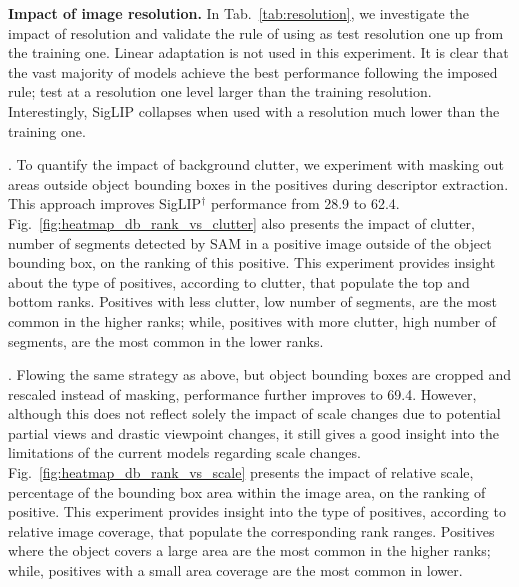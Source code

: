 \noindent\textbf{Impact of image resolution.}
In Tab.~\ref{tab:resolution}, we investigate the impact of resolution and validate the rule of using as test resolution one up from the training one. Linear adaptation is not used in this experiment. It is clear that the vast majority of models achieve the best performance following the imposed rule; test at a resolution one level larger than the training resolution. Interestingly, SigLIP collapses when used with a resolution much lower than the training one. 

. To quantify the impact of background clutter, we experiment with masking out areas outside object bounding boxes in the positives during descriptor extraction. This approach improves SigLIP$^\dagger$ performance from 28.9 to 62.4.
Fig.~\ref{fig:heatmap_db_rank_vs_clutter} also presents the impact of clutter, \ie number of segments detected by SAM in a positive image outside of the object bounding box, on the ranking of this positive.
This experiment provides insight about the type of positives, according to clutter, that populate the top and bottom ranks.
Positives with less clutter, \ie low number of segments, are the most common in the higher ranks; while, positives with more clutter, \ie high number of segments, are the most common in the lower ranks.

. Flowing the same strategy as above, but object bounding boxes are cropped and rescaled instead of masking, performance further improves to 69.4. However, although this does not reflect solely the impact of scale changes due to potential partial views and drastic viewpoint changes, it still gives a good insight into the limitations of the current models regarding scale changes.
Fig.~\ref{fig:heatmap_db_rank_vs_scale} presents the impact of relative scale, \ie percentage of the bounding box area within the image area, on the ranking of positive. This experiment provides insight into the type of positives, according to relative image coverage, that populate the corresponding rank ranges. Positives where the object covers a large area are the most common in the higher ranks; while, positives with a small area coverage are the most common in lower.

